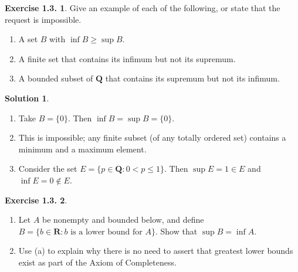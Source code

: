 \documentclass[12pt]{article}
\theoremstyle{definition}
\theoremstyle{exercise}
\newtheorem{exercise}{Exercise 1.3.}
\theoremstyle{solution}
\newtheorem*{solution}{Solution}
\newcommand{\Q}{\mathbf{Q}}
\newcommand{\R}{\mathbf{R}}
\begin{document}
\begin{exercise}
\label{ex:2}
    Give an example of each of the following, or state that the request is impossible.
    \begin{enumerate}
        \item A set \( B \) with \( \inf B \geq \sup B \).

        \item A finite set that contains its infimum but not its supremum.

        \item A bounded subset of \( \Q \) that contains its supremum but not its infimum.
    \end{enumerate}
\end{exercise}

\begin{solution}
    \begin{enumerate}
        \item Take \( B = \{ 0 \} \). Then \( \inf B = \sup B = \{ 0 \} \).

        \item This is impossible; any finite subset (of any totally ordered set) contains a minimum and a maximum element.

        \item Consider the set \( E = \{ p \in \Q : 0 < p \leq 1 \} \). Then \( \sup E = 1 \in E \) and \( \inf E = 0 \not\in E \).
    \end{enumerate}
\end{solution}

\begin{exercise}
\label{ex:3}
    \begin{enumerate}
        \item Let \( A \) be nonempty and bounded below, and define \( B = \{ b \in \R : b \text{ is a lower bound for } A \} \). Show that \( \sup B = \inf A \).

        \item Use (a) to explain why there is no need to assert that greatest lower bounds exist as part of the Axiom of Completeness.
    \end{enumerate}
\end{exercise}
\end{document}
